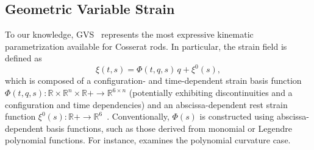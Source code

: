 \subsection{Geometric Variable Strain}
To our knowledge, \gls{GVS}~\citep{renda2020geometric, boyer2020dynamics, mathew2025reduced} represents the most expressive kinematic parametrization available for Cosserat rods. In particular, the strain field is defined as
\begin{equation}
    \xi(t,s) = \Phi(t,q,s) \, q + \xi^0(s),
\end{equation}
which is composed of a configuration- and time-dependent strain basis function $\Phi(t,q,s): \mathbb{R} \times \mathbb{R}^n \times \mathbb{R}+ \to \mathbb{R}^{6 \times n}$ (potentially exhibiting discontinuities and a configuration and time dependencies) and an abscissa-dependent rest strain function $\xi^0(s): \mathbb{R}+ \to \mathbb{R}^6$~\citep{mathew2025reduced}. Conventionally, $\Phi(s)$ is constructed using abscissa-dependent basis functions, such as those derived from monomial or Legendre polynomial functions\citep{mathew2025reduced}. For instance, \citet{della2019control} examines the polynomial curvature case.


